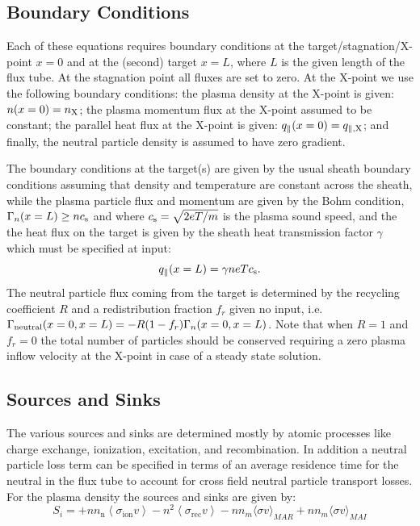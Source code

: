 \documentclass[amsmath,amssymb,a4]{revtex4-2}
\begin{document}
\subsection{Boundary Conditions}

Each of these equations requires boundary conditions at the target/stagnation/X-point $x=0$ and at the (second) target $x=L$, where $L$ is the given length of the flux tube. At the stagnation point all fluxes are set to zero. At the X-point we use the following boundary conditions:
the plasma density at the X-point is given: $n(x=0) = n_{\rm X}$; the plasma momentum flux at the X-point assumed to be constant; the parallel heat flux at the X-point is given:  $q_\parallel(x=0) = q_{\parallel,\rm X}$; and finally, the neutral particle density is assumed to have zero gradient.

The boundary conditions at the target(s) are given by the usual sheath boundary conditions assuming that density and temperature are constant across the sheath, while the plasma particle flux and momentum are given by the Bohm condition, $\Gamma_n(x=L) \ge n c_{\rm s}$ and  where $c_{\rm s} = \sqrt{2eT/m}$ is the plasma sound speed, and the the heat flux on the target is given by the sheath heat transmission factor $\gamma$ which must be specified at input:
\begin{equation}\label{sheath_heat_transmission}
    q_\parallel(x=L) = \gamma n e T c_{\rm s}.
\end{equation}
The neutral particle flux coming from the target is determined by the recycling coefficient $R$ and a redistribution fraction $f_r$ given no input, i.e. $\Gamma_{\rm neutral}(x=0,x=L) = - R (1 - f_r) \Gamma_n(x=0,x=L)$.
Note that when $R=1$ and $f_r=0$ the total number of particles should be conserved requiring a zero plasma inflow velocity at the X-point in case of a steady state solution.


\subsection{Sources and Sinks}

The various sources and sinks are determined mostly by atomic processes like charge exchange, ionization, excitation, and recombination. In addition a neutral particle loss term can be specified in terms of an average residence time for the neutral in the flux tube to account for cross field neutral particle transport losses. For the plasma density the sources and sinks are given by:
\begin{equation}\label{particle_source}
    S_i=+n n_{\mathrm{n}}\left\langle\sigma_{\mathrm{ion}} v\right\rangle-n^2\left\langle\sigma_{\mathrm{rec}} v\right\rangle  - nn_m\langle\sigma v \rangle_{MAR} + nn_m\langle\sigma v \rangle_{MAI} 
\end{equation}
\end{document}
